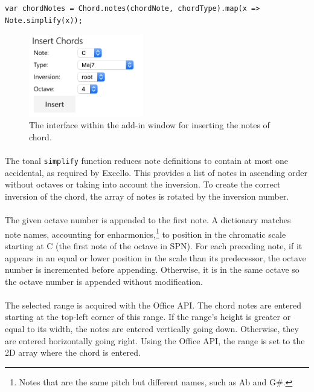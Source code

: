 \begin{verbatim}
var chordNotes = Chord.notes(chordNote, chordType).map(x => Note.simplify(x));
\end{verbatim}
\vspace{-10pt}

\begin{figure}[htb]
\centerline{\includegraphics[width=50mm]{figs/insertChord.png}}
\caption{The interface within the add-in window for inserting the notes of chord.}
\label{fig:chordInput}
\end{figure}

\vspace{-20pt}
\paragraph{} The tonal \texttt{simplify} function reduces note definitions to contain at most one accidental, as required by Excello. This provides a list of notes in ascending order without octaves or taking into account the inversion. To create the correct inversion of the chord, the array of notes is rotated by the inversion number.

\paragraph{} The given octave number is appended to the first note. A dictionary matches note names, accounting for enharmonics,\footnote{Notes that are the same pitch but different names, such as Ab and G\#.} to position in the chromatic scale starting at C (the first note of the octave in SPN). For each preceding note, if it appears in an equal or lower position in the scale than its predecessor, the octave number is incremented before appending. Otherwise, it is in the same octave so the octave number is appended without modification.

\paragraph{} The selected range is acquired with the Office API. The chord notes are entered starting at the top-left corner of this range. If the range's height is greater or equal to its width, the notes are entered vertically going down. Otherwise, they are entered horizontally going right. Using the Office API, the range is set to the 2D array where the chord is entered.

